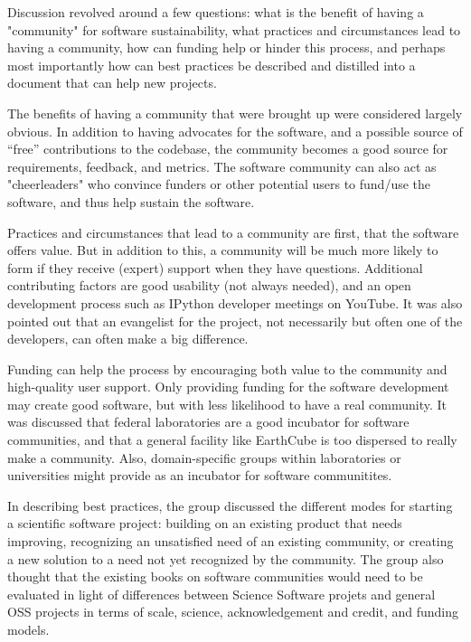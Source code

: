 Discussion revolved around a few questions: what is the benefit of having a "community" for software sustainability, what
practices and circumstances lead to having a community, how can funding help or hinder this process, and perhaps most
importantly how can best practices be described and distilled into a document that can help new projects.

The benefits of having a community that were brought up were considered largely obvious. In addition to having advocates for
the software, and a possible source of ``free'' contributions to the codebase, the community becomes a good source for
requirements, feedback, and metrics. The software community can also act as "cheerleaders" who convince funders or other
potential users to fund/use the software, and thus help sustain the software.

Practices and circumstances that lead to a community are first, that the software offers value. But in addition to this, a
community will be much more likely to form if they receive (expert) support when they have questions. Additional contributing
factors are good usability (not always needed), and an open development process such as IPython developer meetings on YouTube.
It was also pointed out that an evangelist for the project, not necessarily but often one of the developers, can often make a
big difference. 

Funding can help the process by encouraging both value to the community and high-quality user support. Only providing funding
for the software development may create good software, but with less likelihood to have a real community. It was discussed
that federal laboratories are a good incubator for software communities, and that a general facility like EarthCube is too
dispersed to really make a community. Also, domain-specific groups within laboratories or universities might provide as an
incubator for software communitites.

In describing best practices, the group discussed the different modes for starting a scientific software project: building on
an existing product that needs improving, recognizing an unsatisfied need of an existing community, or creating a new solution
to a need not yet recognized by the community. The group also thought that the existing books on software communities would
need to be evaluated in light of differences between Science Software projets and general OSS projects in terms of scale,
science, acknowledgement and credit, and funding models.


